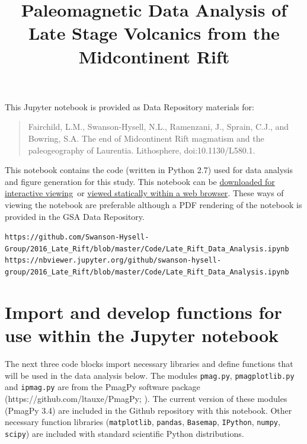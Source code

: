 \documentclass{article}
\title{Paleomagnetic Data Analysis of Late Stage Volcanics from the Midcontinent Rift}
\date{}
\begin{document}
    
    
    \maketitle
    
    

    
\label{paleomagnetic-data-analysis-of-late-stage-volcanics-from-the-midcontinent-rift}

\noindent This Jupyter notebook is provided as Data Repository materials for:
\begin{quote}
Fairchild, L.M., Swanson-Hysell, N.L., Ramenzani, J., Sprain, C.J., and Bowring, S.A. The end of Midcontinent Rift magmatism and the paleogeography of Laurentia. Lithosphere, doi:10.1130/L580.1.
\end{quote}
This notebook contains the code (written in Python 2.7) used for data analysis and figure generation for this study. This notebook can be \href{https://github.com/Swanson-Hysell-Group/2016_Late_Rift/blob/master/Code/Late_Rift_Data_Analysis.ipynb}{downloaded for interactive viewing}\footnotemark\ or \href{https://nbviewer.jupyter.org/github/swanson-hysell-group/2016_Late_Rift/blob/master/Code/Late_Rift_Data_Analysis.ipynb}{viewed statically within a web browser}\footnotemark . These ways of viewing the notebook are preferable although a PDF rendering of the notebook is provided in the GSA Data Repository.\\

\footnoterule

\noindent\footnotemark[1]\texttt{\scriptsize{https://github.com/Swanson-Hysell-Group/2016\_Late\_Rift/blob/master/Code/Late\_Rift\_Data\_Analysis.ipynb}}
\footnotemark[2]\texttt{\scriptsize{https://nbviewer.jupyter.org/github/swanson-hysell-group/2016\_Late\_Rift/blob/master/Code/Late\_Rift\_Data\_Analysis.ipynb}}

\tableofcontents{}

\section{Import and develop functions for use within the Jupyter notebook}\label{import-and-develop-functions-for-use-within-the-jupyter-notebook}
The next three code blocks import necessary libraries and define functions
that will be used in the data analysis below. The modules
\texttt{pmag.py}, \texttt{pmagplotlib.py} and \texttt{ipmag.py} are from
the PmagPy software package (https://github.com/ltauxe/PmagPy; \citealp{Tauxe2016a}). The
current version of these modules (PmagPy 3.4) are included in the Github
repository with this notebook. Other necessary function libraries
(\texttt{matplotlib}, \texttt{pandas}, \texttt{Basemap},
\texttt{IPython}, \texttt{numpy}, \texttt{scipy}) are included with
standard scientific Python distributions.
\end{document}
